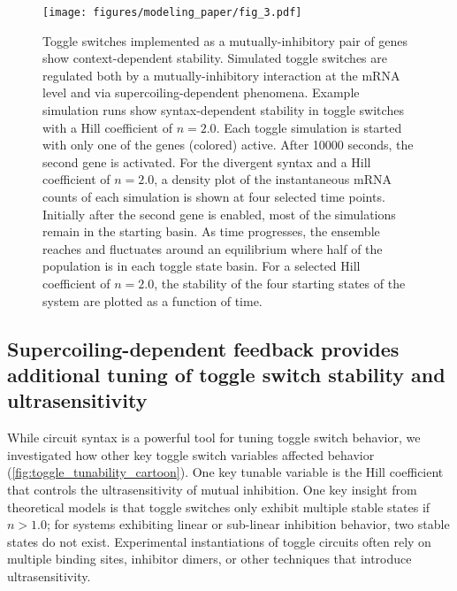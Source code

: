 \documentclass[11pt]{article}
\begin{document}
\begin{figure}[htbp]
    \centering
    {\texttt{[image: figures/modeling\_paper/fig\_3.pdf]}
    \label{fig:toggle_cartoon} %
    \label{fig:toggle_orientation_examples}
    \label{fig:toggle_basin_stability_over_time}
    \label{fig:toggle_stable_frac_n_2.0}
    }
    \caption{Toggle switches implemented as a mutually-inhibitory pair of genes show context-dependent stability.
     Simulated toggle switches are regulated both by a mutually-inhibitory interaction at the mRNA level and via supercoiling-dependent phenomena. 
     Example simulation runs show syntax-dependent stability in toggle switches with a Hill coefficient of \(n = 2.0\). Each toggle simulation is started with only one of the genes (colored) active. After 10000 seconds, the second gene is activated.
     For the divergent syntax and a Hill coefficient of \(n = 2.0\), a density plot of the instantaneous mRNA counts of each simulation is shown at four selected time points. Initially after the second gene is enabled, most of the simulations remain in the starting basin. As time progresses, the ensemble reaches and fluctuates around an equilibrium where half of the population is in each toggle state basin.
     For a selected Hill coefficient of \(n = 2.0\), the stability of the four starting states of the system are plotted as a function of time.
} \label{fig:top:toggle_switch}
\end{figure}

\subsection{Supercoiling-dependent feedback provides additional tuning of toggle switch stability and ultrasensitivity}
While circuit syntax is a powerful tool for tuning toggle switch behavior, we investigated how other key toggle switch variables affected behavior (\cref{fig:toggle_tunability_cartoon}). One key tunable variable is the Hill coefficient that controls the ultrasensitivity of mutual inhibition. One key insight from theoretical models is that toggle switches only exhibit multiple stable states if \(n > 1.0\); for systems exhibiting linear or sub-linear inhibition behavior, two stable states do not exist. Experimental instantiations of toggle circuits often rely on multiple binding sites, inhibitor dimers, or other techniques that introduce ultrasensitivity.
\end{document}
